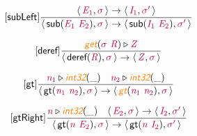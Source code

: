 \documentclass[10pt,leqno,fleqn]{article}
\newcommand{\artVariable}[1]{\mbox{\color{purple}\em #1\/}}
\newcommand{\artConstructor}[1]{\mbox{\sf #1}}
\newcommand{\artSpecial}[1]{\mbox{\color{orange}\sf\em #1}}
\begin{document}
\begin{equation}
\tag*{[\artConstructor{\sf subLeft}]}
\begin{split}\frac{\langle\, \artVariable{E$_{1}$}, \artVariable{$\sigma$}\,\rangle \rightarrow \langle\, \artVariable{I$_{1}$}, \artVariable{$\sigma$\/$^\prime$}\,\rangle }{\langle\, \artConstructor{\sf sub}(\artVariable{E$_{1}$}\ \artVariable{E$_{2}$}), \artVariable{$\sigma$}\,\rangle \rightarrow \langle\, \artConstructor{\sf sub}(\artVariable{I$_{1}$}\ \artVariable{E$_{2}$}), \artVariable{$\sigma$\/$^\prime$}\,\rangle }
\end{split}
\end{equation}

\begin{equation}
\tag*{[\artConstructor{\sf deref}]}
\begin{split}\frac{ \artSpecial{get}(\artVariable{$\sigma$}\ \artVariable{R})\triangleright \artVariable{Z} }{\langle\, \artConstructor{\sf deref}(\artVariable{R}), \artVariable{$\sigma$}\,\rangle \rightarrow \langle\, \artVariable{Z}, \artVariable{$\sigma$}\,\rangle }
\end{split}
\end{equation}

\begin{equation}
\tag*{[\artConstructor{\sf gt}]}
\begin{split}\frac{ \artVariable{n$_{1}$}\triangleright \artSpecial{int32}(\_) \quad  \artVariable{n$_{2}$}\triangleright \artSpecial{int32}(\_) }{\langle\, \artConstructor{\sf gt}(\artVariable{n$_{1}$}\ \artVariable{n$_{2}$}), \artVariable{$\sigma$}\,\rangle \rightarrow \langle\, \artSpecial{gt}(\artVariable{n$_{1}$}\ \artVariable{n$_{2}$}), \artVariable{$\sigma$}\,\rangle }
\end{split}
\end{equation}

\begin{equation}
\tag*{[\artConstructor{\sf gtRight}]}
\begin{split}\frac{ \artVariable{n}\triangleright \artSpecial{int32}(\_) \quad \langle\, \artVariable{E$_{2}$}, \artVariable{$\sigma$}\,\rangle \rightarrow \langle\, \artVariable{I$_{2}$}, \artVariable{$\sigma$\/$^\prime$}\,\rangle }{\langle\, \artConstructor{\sf gt}(\artVariable{n}\ \artVariable{E$_{2}$}), \artVariable{$\sigma$}\,\rangle \rightarrow \langle\, \artConstructor{\sf gt}(\artVariable{n}\ \artVariable{I$_{2}$}), \artVariable{$\sigma$\/$^\prime$}\,\rangle }
\end{split}
\end{equation}
\end{document}
